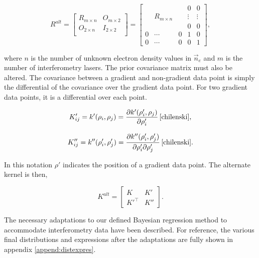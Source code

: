 \begin{equation}
  R^{alt} = 
\begin{bmatrix}
 R_{m\times n} &   O_{m\times2} \\
 O_{2\times n} &   I_{2\times 2} \\
\end{bmatrix}
=
\begin{bmatrix}
 &       &    & 0         & 0\\
  &   R_{m\times n}    &    &  \vdots  & \vdots\\
  &       &    & 0        & 0\\
0 & \cdots & 0  & 1        & 0 \\
0 & \cdots & 0  & 0        & 1
\end{bmatrix},
  \label{eq:Ralt}
\end{equation}

\noindent where $n$ is the number of unknown electron density values in $\vec n_e$ and $m$ is the number of interferometry lasers. The prior covariance matrix must also be altered. The covariance between a gradient and non-gradient data point is simply the differential of the covariance over the gradient data point. For two gradient data points, it is a differential over each point.

\begin{equation}
  K'_{ij} = k'(\rho_i, \rho_j) = \frac{\partial k'(\rho'_i, \rho_j)}{\partial \rho'_i} \, \cite{chilenski},
\end{equation}

\begin{equation}
  K''_{ij} = k''(\rho'_i, \rho'_j) = \frac{\partial k''(\rho'_i, \rho'_j)}{\partial \rho'_i \partial \rho'_j} \, \cite{chilenski}.
\end{equation}

\noindent In this notation $\rho'$ indicates the position of a gradient data point. The alternate kernel is then,

\begin{equation}
  K^{alt} = 
    \begin{bmatrix}
      K & K'\\
      K'^{\top} & K''
    \end{bmatrix}.
\end{equation}

The necessary adaptations to our defined Bayesian regression method to accommodate interferometry data have been described. For reference, the various final distributions and expressions after the adaptations are fully shown in appendix \ref{append:distexpres}.

